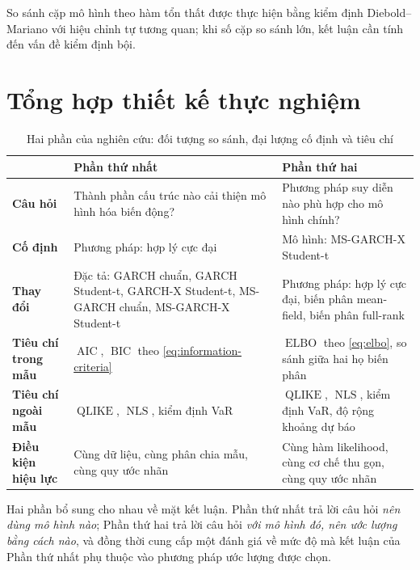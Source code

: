 \documentclass[12pt,a4paper]{article}
\numberwithin{equation}{section}
\theoremstyle{definition}
\newcommand{\ELBO}{\operatorname{ELBO}}
\newcommand{\AIC}{\operatorname{AIC}}
\newcommand{\BIC}{\operatorname{BIC}}
\newcommand{\QLIKE}{\operatorname{QLIKE}}
\newcommand{\NLS}{\operatorname{NLS}}
\begin{document}
So sánh cặp mô hình theo hàm tổn thất được thực hiện bằng kiểm định Diebold--Mariano
\cite{diebold1995} với hiệu chỉnh tự tương quan; khi số cặp so sánh lớn, kết luận cần
tính đến vấn đề kiểm định bội.

\section{Tổng hợp thiết kế thực nghiệm}\label{sec:design-summary}

\begin{table}[H]
\centering\footnotesize
\setlength{\tabcolsep}{4pt}
\caption{Hai phần của nghiên cứu: đối tượng so sánh, đại lượng cố định và tiêu chí}
\label{tab:design}
\begin{tabularx}{\textwidth}{>{\raggedright\arraybackslash\bfseries}p{2.2cm} Y Y}
\toprule
& \textbf{Phần thứ nhất} & \textbf{Phần thứ hai} \\
\midrule
Câu hỏi & Thành phần cấu trúc nào cải thiện mô hình hóa biến động? & Phương pháp suy diễn nào phù hợp cho mô hình chính? \\
\addlinespace[0.2em]
Cố định & Phương pháp: hợp lý cực đại & Mô hình: MS-GARCH-X Student-t \\
\addlinespace[0.2em]
Thay đổi & Đặc tả: GARCH chuẩn, GARCH Student-t, GARCH-X Student-t, MS-GARCH chuẩn, MS-GARCH-X Student-t & Phương pháp: hợp lý cực đại, biến phân mean-field, biến phân full-rank \\
\addlinespace[0.2em]
Tiêu chí trong mẫu & $\AIC$, $\BIC$ theo \eqref{eq:information-criteria} & $\ELBO$ theo \eqref{eq:elbo}, so sánh giữa hai họ biến phân \\
\addlinespace[0.2em]
Tiêu chí ngoài mẫu & $\QLIKE$, $\NLS$, kiểm định VaR & $\QLIKE$, $\NLS$, kiểm định VaR, độ rộng khoảng dự báo \\
\addlinespace[0.2em]
Điều kiện hiệu lực & Cùng dữ liệu, cùng phân chia mẫu, cùng quy ước nhãn & Cùng hàm likelihood, cùng cơ chế thu gọn, cùng quy ước nhãn \\
\bottomrule
\end{tabularx}
\end{table}

Hai phần bổ sung cho nhau về mặt kết luận. Phần thứ nhất trả lời câu hỏi \emph{nên dùng
mô hình nào}; Phần thứ hai trả lời câu hỏi \emph{với mô hình đó, nên ước lượng bằng cách
nào}, và đồng thời cung cấp một đánh giá về mức độ mà kết luận của Phần thứ nhất phụ
thuộc vào phương pháp ước lượng được chọn.
\end{document}
